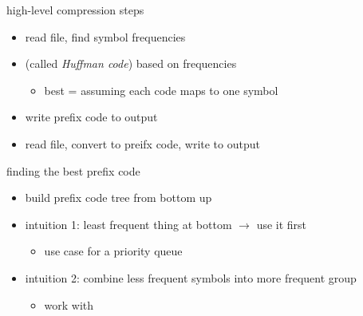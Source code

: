 \begin{frame}{high-level compression steps}
    \begin{itemize}
    \item read file, find symbol frequencies
    \item {} (called \textit{Huffman code}) based on frequencies
        \begin{itemize}
        \item best = assuming each code maps to one symbol
        \end{itemize}
    \item write prefix code to output
    \item read file, convert to preifx code, write to output
    \end{itemize}
    \vspace{.5cm}
\end{frame}

\begin{frame}{finding the best prefix code}
    \begin{itemize}
    \item build prefix code tree from bottom up
    \item intuition 1: least frequent thing at bottom $\rightarrow$ use it first
        \begin{itemize}
        \item use case for a priority queue
        \end{itemize}
    \item intuition 2: combine less frequent symbols into more frequent group
        \begin{itemize}
        \item work with 
        \end{itemize}
    \end{itemize}
\end{frame}
